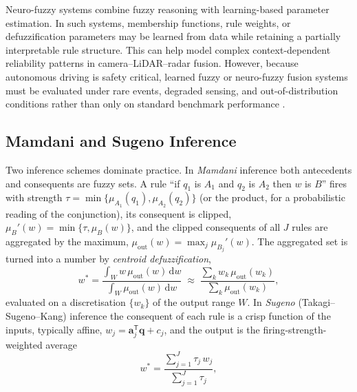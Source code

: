 \documentclass[graybox,envcountchap]{style/SNmono}
\begin{document}
Neuro-fuzzy systems combine fuzzy reasoning with learning-based parameter estimation. In such systems, membership functions, rule weights, or defuzzification parameters may be learned from data while retaining a partially interpretable rule structure. This can help model complex context-dependent reliability patterns in camera--LiDAR--radar fusion. However, because autonomous driving is safety critical, learned fuzzy or neuro-fuzzy fusion systems must be evaluated under rare events, degraded sensing, and out-of-distribution conditions rather than only on standard benchmark performance \cite{khaleghi_multisensor_2013, baltrusaitis_multimodal_2019}.

\subsection{Mamdani and Sugeno Inference}
\label{subsec:mamdani-sugeno}
Two inference schemes dominate practice. In \emph{Mamdani} inference \cite{mamdani1975_fuzzy} both antecedents and consequents are fuzzy sets. A rule ``if $q_1$ is $A_1$ and $q_2$ is $A_2$ then $w$ is $B$'' fires with strength $\tau=\min\{\mu_{A_1}(q_1),\mu_{A_2}(q_2)\}$ (or the product, for a probabilistic reading of the conjunction), its consequent is clipped, $\mu_{B}'(w)=\min\{\tau,\mu_{B}(w)\}$, and the clipped consequents of all $J$ rules are aggregated by the maximum, $\mu_{\mathrm{out}}(w)=\max_j\mu_{B_j}'(w)$. The aggregated set is turned into a number by \emph{centroid defuzzification},
\begin{equation}
w^{\ast}=\frac{\displaystyle\int_{W} w\,\mu_{\mathrm{out}}(w)\,\mathrm{d}w}{\displaystyle\int_{W}\mu_{\mathrm{out}}(w)\,\mathrm{d}w}
\;\approx\;
\frac{\sum_{k} w_k\,\mu_{\mathrm{out}}(w_k)}{\sum_{k}\mu_{\mathrm{out}}(w_k)},
\label{eq:centroid-defuzzification}
\end{equation}
evaluated on a discretisation $\{w_k\}$ of the output range $W$. In \emph{Sugeno} (Takagi--Sugeno--Kang) inference \cite{takagi1985_sugeno} the consequent of each rule is a crisp function of the inputs, typically affine, $w_j=\mathbf{a}_j^{\mathsf T}\mathbf{q}+c_j$, and the output is the firing-strength-weighted average
\begin{equation}
w^{\ast}=\frac{\sum_{j=1}^{J}\tau_j\,w_j}{\sum_{j=1}^{J}\tau_j},
\label{eq:sugeno-output}
\end{equation}
\end{document}
